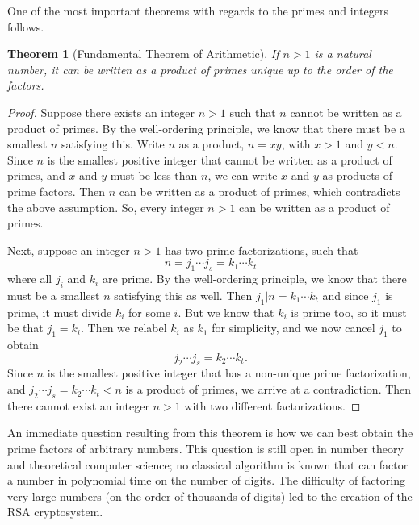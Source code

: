 \documentclass{amsart}
\newtheorem{thm}{Theorem}
\theoremstyle{definition}
\theoremstyle{case}
\begin{document}
	One of the most important theorems with regards to the primes and integers follows.
	\begin{thm}[Fundamental Theorem of Arithmetic]\label{arith}
		If $n > 1$ is a natural number, it can be written as a product of primes unique up to the order of the factors.
	\end{thm}
	\begin{proof}
		Suppose there exists an integer $n>1$ such that $n$ cannot be written as a product of primes. By the well-ordering principle, we know that there must be a smallest $n$ satisfying this. Write $n$ as a product, $n = xy$, with $x>1$ and $y<n$. Since $n$ is the smallest positive integer that cannot be written as a product of primes, and $x$ and $y$ must be less than $n$, we can write $x$ and $y$ as products of prime factors. Then $n$ can be written as a product of primes, which contradicts the above assumption. So, every integer $n>1$ can be written as a product of primes.
		
		Next, suppose an integer $n>1$ has two prime factorizations, such that
		$$ n = j_1 \cdots j_s = k_1 \cdots k_t $$
		where all $j_i$ and $k_i$ are prime. By the well-ordering principle, we know that there must be a smallest $n$ satisfying this as well. Then $j_1 | n = k_1 \cdots k_t$ and since $j_1$ is prime, it must divide $k_i$ for some $i$. But we know that $k_i$ is prime too, so it must be that $j_1 = k_i$. Then we relabel $k_i$ as $k_1$ for simplicity, and we now cancel $j_1$ to obtain
		$$ j_2 \cdots j_s = k_2 \cdots k_t . $$
		Since $n$ is the smallest positive integer that has a non-unique prime factorization, and $ j_2 \cdots j_s = k_2 \cdots k_t < n $ is a product of primes, we arrive at a contradiction. Then there cannot exist an integer $n>1$ with two different factorizations.
	\end{proof}

	An immediate question resulting from this theorem is how we can best obtain the prime factors of arbitrary numbers. This question is still open in number theory and theoretical computer science; no classical algorithm is known that can factor a number in polynomial time on the number of digits. The difficulty of factoring very large numbers (on the order of thousands of digits) led to the creation of the RSA cryptosystem.
	
\end{document}
